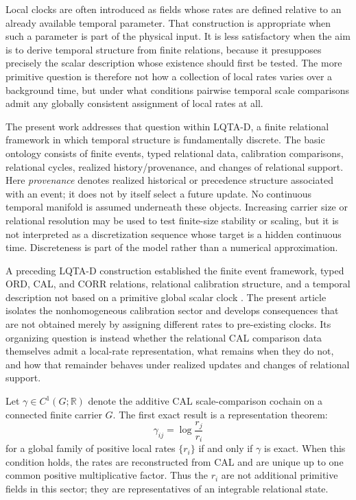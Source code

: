 \documentclass[aip,jmp,amsmath,amssymb,reprint]{revtex4-2}
\begin{document}
Local clocks are often introduced as fields whose rates are defined relative to an already available temporal parameter. That construction is appropriate when such a parameter is part of the physical input. It is less satisfactory when the aim is to derive temporal structure from finite relations, because it presupposes precisely the scalar description whose existence should first be tested. The more primitive question is therefore not how a collection of local rates varies over a background time, but under what conditions pairwise temporal scale comparisons admit any globally consistent assignment of local rates at all.

The present work addresses that question within LQTA-D, a finite relational framework in which temporal structure is fundamentally discrete. The basic ontology consists of finite events, typed relational data, calibration comparisons, relational cycles, realized history/provenance, and changes of relational support. Here \emph{provenance} denotes realized historical or precedence structure associated with an event; it does not by itself select a future update. No continuous temporal manifold is assumed underneath these objects. Increasing carrier size or relational resolution may be used to test finite-size stability or scaling, but it is not interpreted as a discretization sequence whose target is a hidden continuous time. Discreteness is part of the model rather than a numerical approximation.

A preceding LQTA-D construction established the finite event framework, typed ORD, CAL, and CORR relations, relational calibration structure, and a temporal description not based on a primitive global scalar clock \cite{BojViudes2026TemporalDomains}. The present article isolates the nonhomogeneous calibration sector and develops consequences that are not obtained merely by assigning different rates to pre-existing clocks. Its organizing question is instead whether the relational CAL comparison data themselves admit a local-rate representation, what remains when they do not, and how that remainder behaves under realized updates and changes of relational support.

Let $\gamma\in C^1(G;\mathbb R)$ denote the additive CAL scale-comparison cochain on a connected finite carrier $G$. The first exact result is a representation theorem:
\begin{equation}
\gamma_{ij}=\log\frac{r_j}{r_i}
\label{eq:intro-rate-representation}
\end{equation}
for a global family of positive local rates $\{r_i\}$ if and only if $\gamma$ is exact. When this condition holds, the rates are reconstructed from CAL and are unique up to one common positive multiplicative factor. Thus the $r_i$ are not additional primitive fields in this sector; they are representatives of an integrable relational state.
\end{document}
